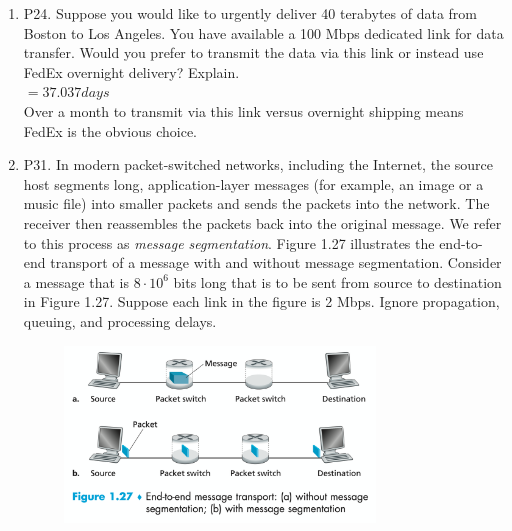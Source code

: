 \documentclass[12pt]{article}
\begin{document}
\begin{enumerate}
\item P24. Suppose you would like to urgently deliver 40 terabytes of data from Boston to Los Angeles. You have available a 100 Mbps dedicated link for data transfer. Would you prefer to transmit the data via this link or instead use FedEx overnight delivery? Explain.\\[1em]
\(=37.037 days\)\\[0.5em]
Over a month to transmit via this link versus overnight shipping means FedEx is the obvious choice.
\item P31. In modern packet-switched networks, including the Internet, the source host segments long, application-layer messages (for example, an image or a music file) into smaller packets and sends the packets into the network. The receiver then reassembles the packets back into the original message. We refer to this process as \textit{message segmentation}. Figure 1.27 illustrates the end-to-end transport of a message with and without message segmentation. Consider a message that is \(8 \cdot 10^6\)  bits long that is to be sent from source to destination in Figure 1.27. Suppose each link in the figure is 2 Mbps. Ignore propagation, queuing, and processing delays.
\begin{figure}[h!]
    \centering
    \includegraphics[width=0.78\textwidth]{Fig1.27.png}
    \end{figure}


\end{enumerate}
\end{document}

